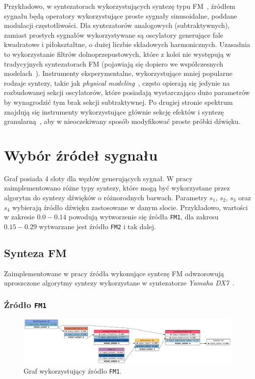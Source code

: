 Przykładowo, w syntezatorach wykorzystujących syntezę typu FM~\cite{yamaha_dx7_manual}, źródłem
sygnału będą operatory wykorzystujące proste sygnały sinusoidalne, poddane modulacji częstotliwości.
Dla syntezatorów analogowych (subtraktywnych), zamiast prostych sygnałów wykorzystywane są
oscylatory generujące fale kwadratowe i piłokształtne, o dużej liczbie składowych harmonicznych.
Uzasadnia to wykorzystanie filtrów dolnoprzepustowych, które z kolei nie występują w tradycyjnych
syntezatorach FM (pojawiają się dopiero we współczesnych modelach~\cite{digitone_manual}).
Instrumenty eksperymentalne, wykorzystujące mniej popularne rodzaje syntezy, takie jak
\textit{physical modeling}~\cite{yamaha_vl1_manual}, często opierają się jedynie na rozbudowanej
sekcji oscylatorów, które posiadają wystarczająco dużo parametrów by wynagrodzić tym brak
sekcji subtraktywnej. Po drugiej stronie spektrum znajdują się instrumenty wykorzystujące
głównie sekcję efektów i syntezę granularną~\cite{microcosm_hologram_manual},
aby w nieoczekiwany sposób modyfikować proste próbki dźwięku.

\section{Wybór źródeł sygnału}

Graf posiada 4 sloty dla węzłów generujących sygnał. W pracy zaimplementowano różne
typy syntezy, które mogą być wykorzystane przez algorytm do syntezy dźwięków o różnorodnych barwach. 
Parametry $s_1$, $s_2$, $s_3$ oraz $s_4$ wybierają źródło dźwięku zastosowane w danym
slocie. Przykładowo, wartości w zakresie $0.0 - 0.14$ powodują wytworzenie się
źródła \texttt{FM1}, dla zakresu $0.15-0.29$ wytwarzane jest źródło \texttt{FM2}
i tak dalej.

\subsection{Synteza FM}

Zaimplementowane w pracy źródła wykonujące syntezę FM odwzorowują uproszczone algorytmy syntezy wykorzystane
w syntezatorze \textit{Yamaha DX7}~\cite{yamaha_dx7_manual}.

\subsubsection{Źródło \texttt{FM1}}

\begin{figure}[H]
    \centering
    \includegraphics[width=1.0\linewidth]{rys06/gene_fm1.png}
    \caption{
      Graf wykorzystujący źródło \texttt{FM1}.
    }\label{fig:gene_f1}
\end{figure}


